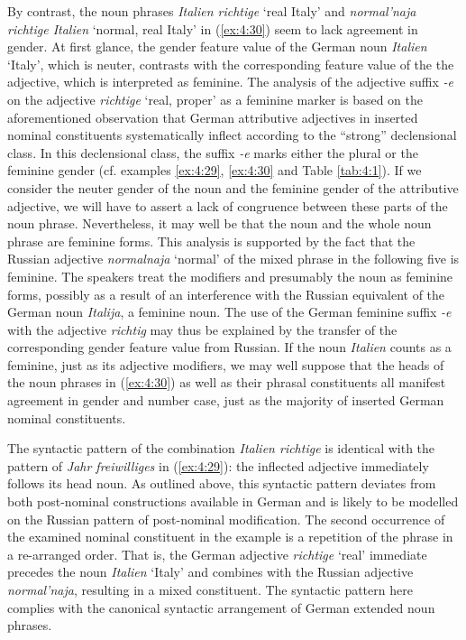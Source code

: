 By contrast, the noun phrases \textit{Italien richtige} `real Italy' and \textit{normal'naja richtige Italien} `normal, real Italy' in (\ref{ex:4:30}) seem to lack agreement in gender. At first glance, the gender feature value of the German noun \textit{Italien} `Italy', which is neuter, contrasts with the corresponding feature value of the the adjective, which is interpreted as feminine. The analysis of the adjective suffix \textit{-e} on the adjective \textit{richtige} `real, proper' as a feminine marker is based on the aforementioned observation that German attributive adjectives in inserted nominal constituents systematically inflect according to the “strong” declensional class. In this declensional class, the suffix \textit{-e} marks either the plural or the feminine gender (cf. examples \ref{ex:4:29}, \ref{ex:4:30} and Table \ref{tab:4:1}). If we consider the neuter gender of the noun and the feminine gender of the attributive adjective, we will have to assert a lack of congruence between these parts of the noun phrase. Nevertheless, it may well be that the noun and the whole noun phrase are feminine forms. This analysis is supported by the fact that the Russian adjective \textit{normalnaja} `normal' of the mixed phrase in the following five is feminine. The speakers treat the modifiers and presumably the noun as feminine forms, possibly as a result of an interference with the Russian equivalent of the German noun \textit{Italija}, a feminine noun. The use of the German feminine suffix \textit{-e} with the adjective \textit{richtig} may thus be explained by the transfer of the corresponding gender feature value from Russian. If  the noun \textit{Italien} counts as a feminine, just as its adjective modifiers, we may well suppose that the heads of the noun phrases in (\ref{ex:4:30}) as well as their phrasal constituents all manifest agreement in gender and number case, just as the majority of inserted German nominal constituents.

The syntactic pattern of the combination \textit{Italien richtige} is identical with the pattern of \textit{Jahr freiwilliges} in (\ref{ex:4:29}): the inflected adjective immediately follows its head noun. As outlined above, this syntactic pattern deviates from both post-nominal constructions available in German and is likely to be modelled on the Russian pattern of post-nominal modification. The second occurrence of the examined nominal constituent in the example is a repetition of the phrase in a re-arranged order. That is, the German adjective \textit{richtige} `real' immediate precedes the noun \textit{Italien} `Italy' and combines with the Russian adjective \textit{normal'naja}, resulting in a mixed constituent. The syntactic pattern here complies with the canonical syntactic arrangement of German extended noun phrases.

